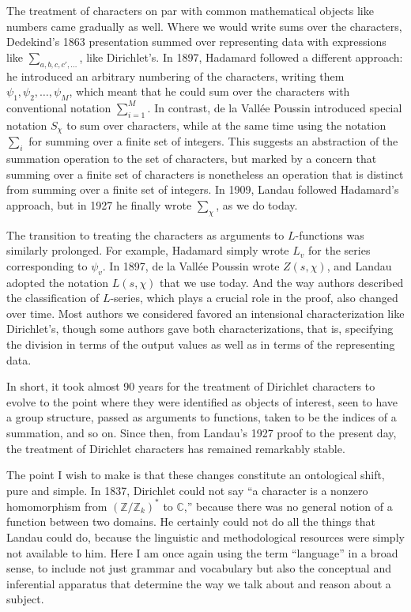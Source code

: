 \documentclass[11pt]{article}
\newcommand{\ZZ}{\mathbb{Z}}
\newcommand{\CC}{\mathbb{C}}
\begin{document}
The treatment of characters on par with common mathematical objects like numbers came gradually as well. Where we would write sums over the characters, Dedekind's 1863 presentation summed over representing data with expressions like $\sum_{a, b, c, c', \ldots}$, like Dirichlet's. In 1897, Hadamard followed a different approach: he introduced an arbitrary numbering of the characters, writing them $\psi_1, \psi_2, \ldots, \psi_M$, which meant that he could sum over the characters with conventional notation $\sum_{i = 1}^M$. In contrast, de la Vall\'ee Poussin introduced special notation $S_\chi$ to sum over characters, while at the same time using the notation $\sum_i$ for summing over a finite set of integers. This suggests an abstraction of the summation operation to the set of characters, but marked by a concern that summing over a finite set of characters is nonetheless an operation that is distinct from summing over a finite set of integers. In 1909, Landau followed Hadamard's approach, but in 1927 he finally wrote $\sum_\chi$, as we do today.

The transition to treating the characters as arguments to $L$-functions was similarly prolonged. For example, Hadamard simply wrote $L_v$ for the series corresponding to $\psi_v$. In 1897, de la Vall\'ee Poussin wrote $Z(s, \chi)$, and Landau adopted the notation $L(s, \chi)$ that we use today. And the way authors described the classification of $L$-series, which plays a crucial role in the proof, also changed over time. Most authors we considered favored an intensional characterization like Dirichlet's, though some authors gave both characterizations, that is, specifying the division in terms of the output values as well as in terms of the representing data.

In short, it took almost 90 years for the treatment of Dirichlet characters to evolve to the point where they were identified as objects of interest, seen to have a group structure, passed as arguments to functions, taken to be the indices of a summation, and so on. Since then, from Landau's 1927 proof to the present day, the treatment of Dirichlet characters has remained remarkably stable.

The point I wish to make is that these changes constitute an ontological shift, pure and simple. In 1837, Dirichlet could not say ``a character is a nonzero homomorphism from $(\ZZ/\ZZ_k)^*$ to $\CC$,'' because there was no general notion of a function between two domains. He certainly could not do all the things that Landau could do, because the linguistic and methodological resources were simply not available to him. Here I am once again using the term ``language'' in a broad sense, to include not just grammar and vocabulary but also the conceptual and inferential apparatus that determine the way we talk about and reason about a subject.
\end{document}

